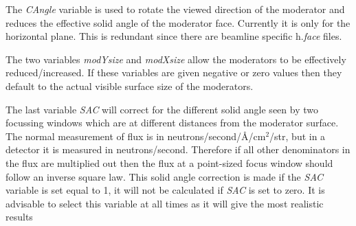 The \textit{CAngle} variable is used to rotate the viewed direction
of the moderator and reduces the effective solid angle of the
moderator face. Currently it is only for the horizontal plane.
This is redundant since there are beamline specific h.\textit{{face}} files.

The two variables \textit{modYsize} and \textit{modXsize}
allow the moderators to be effectively reduced/increased. If
these variables are given  negative or zero values then they default to the actual
visible surface size of the moderators.

The last variable \textit{SAC} will correct for the different solid angle seen by two
focussing windows which are at different distances from the moderator surface. The
normal measurement of flux is in neutrons/second/\AA/cm{$^2$}/str, but in a detector
it is measured in neutrons/second. Therefore if all other denominators in the flux are
multiplied out then the flux at a point-sized focus window should follow an inverse square law.
This solid angle correction is made if the \textit{SAC} variable is set equal to 1, it will not be
calculated if \textit{SAC} is set to zero. It is advisable to select this variable at all times as it will give the most realistic results

